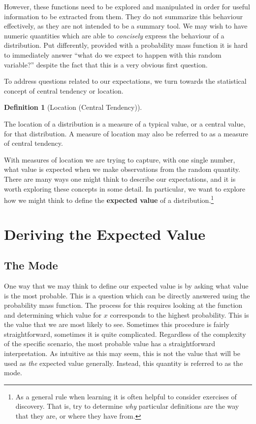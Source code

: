 \documentclass[
  letterpaper,
  DIV=11,
  numbers=noendperiod]{scrreprt}
\theoremstyle{definition}
\theoremstyle{definition}
\theoremstyle{definition}
\newtheorem{definition}{Definition}[chapter]
\theoremstyle{remark}
\begin{document}
However, these functions need to be explored and manipulated in order
for useful information to be extracted from them. They do not summarize
this behaviour effectively, as they are not intended to be a summary
tool. We may wish to have numeric quantities which are able to
\emph{concisely} express the behaviour of a distribution. Put
differently, provided with a probability mass function it is hard to
immediately answer ``what do we expect to happen with this random
variable?'' despite the fact that this is a very obvious first question.

To address questions related to our expectations, we turn towards the
statistical concept of central tendency or location.

\begin{definition}[Location (Central
Tendency)]\protect\hypertarget{def-location}{}\label{def-location}

The location of a distribution is a measure of a typical value, or a
central value, for that distribution. A measure of location may also be
referred to as a measure of central tendency.

\end{definition}

With measures of location we are trying to capture, with one single
number, what value is expected when we make observations from the random
quantity. There are many ways one might think to describe our
expectations, and it is worth exploring these concepts in some detail.
In particular, we want to explore how we might think to define the
\textbf{expected value} of a distribution.\footnote{As a general rule
  when learning it is often helpful to consider exercises of discovery.
  That is, try to determine \emph{why} particular definitions are the
  way that they are, or where they have from.}

\section{Deriving the Expected Value}\label{deriving-the-expected-value}

\subsection{The Mode}\label{the-mode}

One way that we may think to define our expected value is by asking what
value is the most probable. This is a question which can be directly
answered using the probability mass function. The process for this
requires looking at the function and determining which value for \(x\)
corresponds to the highest probability. This is the value that we are
most likely to see. Sometimes this procedure is fairly straightforward,
sometimes it is quite complicated. Regardless of the complexity of the
specific scenario, the most probable value has a straightforward
interpretation. As intuitive as this may seem, this is not the value
that will be used as \emph{the} expected value generally. Instead, this
quantity is referred to as the mode.
\end{document}
